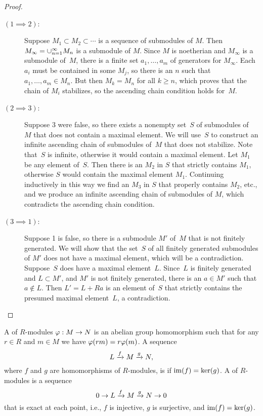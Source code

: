 \begin{proof}
	\hfill
	\begin{description}
		\item[$(1\implies 2)$:]
			Suppose $M_1\subset M_2\subset \cdots$ is a
			sequence of submodules of $M$.  Then
			$M_\infty=\cup_{n=1}^{\infty} M_n$ is a submodule of $M$.
			Since $M$ is noetherian and $M_\infty$ is a submodule of~$M$,
			there is a finite set $a_1,\ldots, a_m$ of 
			generators for $M_{\infty}$.  Each $a_i$
			must be contained in some $M_j$, so there is an $n$ such that
			$a_1,\ldots, a_m\in M_n$.  But then $M_{k}=M_n$ for all
			$k\geq n$, which proves that the chain of $M_i$ stabilizes,
			so the ascending chain condition holds for~$M$.
		
		\item[$(2\implies 3)$:]
			Suppose 3 were false, so there exists
			a nonempty set~$S$ of submodules of~$M$ that does not
			contain a maximal element.  We will use~$S$ to construct
			an infinite ascending chain of submodules of~$M$ that
			does not stabilize. Note that~$S$ is infinite, otherwise
			it would contain a maximal element.  Let $M_1$ be
			any element of~$S$.  Then there is an $M_2$ in $S$ that
			strictly contains $M_1$, otherwise $S$ would contain the maximal
			element $M_1$. Continuing inductively in this way we find
			an $M_3$ in $S$ that properly contains $M_2$, etc., and we
			produce an infinite ascending chain of submodules of $M$,
			which contradicts the ascending chain condition.
		
		\item[$(3\implies 1)$:]
			Suppose 1 is false, so there is a submodule $M'$ of~$M$ that
			is not finitely generated.  We will show that the set~$S$ of
			all finitely generated submodules of $M'$ does not
			have a maximal element, which will be a contradiction.
			Suppose~$S$ does have a maximal element~$L$.  Since~$L$
			is finitely generated and $L\subset M'$, and $M'$ is not
			finitely generated, there is an $a\in M'$ such that
			$a\not\in L$.  Then $L'=L+Ra$ is an element of~$S$ that
			strictly contains the presumed maximal element~$L$,
			a contradiction.
	\end{description}
\end{proof}

\begin{definition}
	A  of $R$-modules $\varphi:M\to N$ is an abelian
	group homomorphism such that for any $r\in R$ and $m\in M$ we have
	$\varphi(rm) = r\varphi(m)$. A sequence
	$$
		L \xrightarrow{f} M \xrightarrow{g} N,
	$$
	where $f$ and $g$ are homomorphisms of $R$-modules, is 
	if $\operatorname{im}(f)=\ker(g)$. A  of $R$-modules
	is a sequence
	$$
		0 \to L \xrightarrow{f} M \xrightarrow{g} N \to 0
	$$
	that is exact at each point, i.e., $f$ is injective, $g$ is surjective,
	and $\operatorname{im}(f) = \ker(g)$.
\end{definition}

